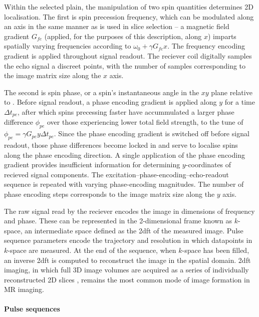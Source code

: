 Within the selected plain, the manipulation of two spin quantities determines 2D localisation.
The first is spin precession frequency, which can be modulated along an axis in the same manner as is used in slice selection -- a magnetic field gradient $G_{fe}$ (applied, for the purposes of this description, along $x$) imparts spatially varying frequencies according to $\omega_0 + \gamma G_{fe}x$.
The frequency encoding gradient is applied throughout signal readout. 
The reciever coil digitally samples the echo signal a discreet points, with the number of samples corresponding to the image matrix size along the $x$ axis.

The second is spin phase, or a spin's instantaneous angle in the $xy$ plane relative to .
Before signal readout, a phase encoding gradient is applied along $y$ for a time $\Delta t_{pe}$, after which spins precessing faster have accummulated a larger phase difference $\phi_{pe}$ over those experiencing lower total field strength, to the tune of $\phi_{pe}=\gamma G_{pe}y \Delta t_{pe}$.
Since the phase encoding gradient is switched off before signal readout, those phase differences become locked in and serve to localise spins along the phase encoding direction.
A single application of the phase encoding gradient provides insufficient information for determining $y$-coordinates of recieved signal components.
The excitation--phase-encoding--echo-readout sequence is repeated with varying phase-encoding magnitudes.
The number of phase encoding steps corresponds to the image matrix size along the $y$ axis.

The raw signal read by the reciever encodes the image in dimensions of frequency and phase.
These can be represented in the 2-dimensional frame known as $k$-space, an intermediate space defined as the \gls{2dft} of the measured image.
Pulse sequence parameters encode the trajectory and resolution in which datapoints in $k$-space are measured.
At the end of the sequence, when $k$-space has been filled, an inverse \gls{2dft} is computed to reconstruct the image in the spatial domain.
\Gls{2dft} imaging, in which full 3D image volumes are acquired as a series of individually reconstructed 2D slices , remains the most common  mode of image formation in MR imaging.

\paragraph*{Pulse sequences}

